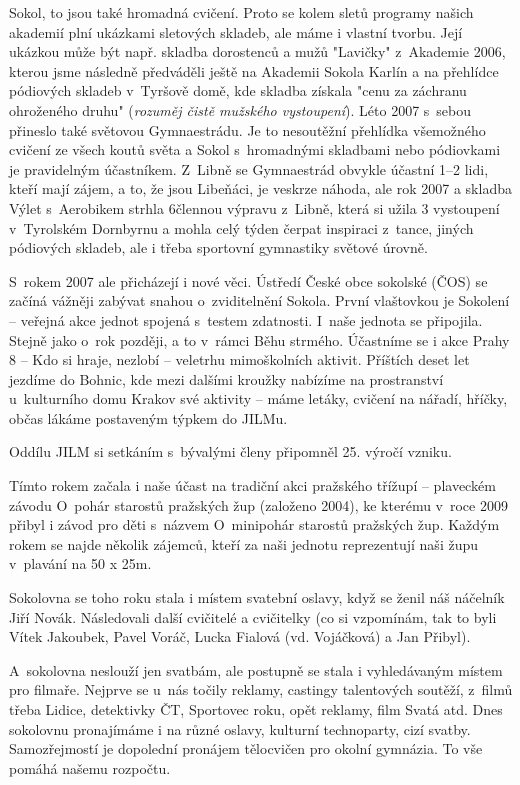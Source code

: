 \documentclass[a5paper, 11pt, twoside]{article}
\begin{document}
Sokol, to jsou také hromadná cvičení. Proto se kolem sletů programy
našich akademií plní ukázkami sletových skladeb, ale máme i vlastní
tvorbu. Její ukázkou může být např. skladba dorostenců a mužů "Lavičky"
z~Akademie 2006, kterou jsme následně předváděli ještě na Akademii
Sokola Karlín a na přehlídce pódiových skladeb v~Tyršově domě, kde
skladba získala "cenu za záchranu ohroženého druhu" (\textit{rozuměj
čistě mužského vystoupení}). Léto 2007 s~sebou přineslo také světovou
Gymnaestrádu. Je to nesoutěžní přehlídka všemožného cvičení ze všech
koutů světa a Sokol s~hromadnými skladbami nebo pódiovkami je
pravidelným účastníkem. Z~Libně se Gymnaestrád obvykle účastní 1--2
lidi, kteří mají zájem, a to, že jsou Libeňáci, je veskrze náhoda, ale
rok 2007 a skladba Výlet s~Aerobikem strhla 6člennou výpravu z~Libně,
která si užila 3 vystoupení v~Tyrolském Dornbyrnu a mohla celý týden
čerpat inspiraci z~tance, jiných pódiových skladeb, ale i třeba
sportovní gymnastiky světové úrovně.

S~rokem 2007 ale přicházejí i nové věci. Ústředí České obce sokolské
(ČOS) se začíná vážněji zabývat snahou o~zviditelnění Sokola. První
vlaštovkou je Sokolení -- veřejná akce jednot spojená s~testem
zdatnosti. I~naše jednota se připojila. Stejně jako o~rok později, a to
v~rámci Běhu strmého. Účastníme se i akce Prahy 8 -- Kdo si hraje,
nezlobí -- veletrhu mimoškolních aktivit. Příštích deset let jezdíme do
Bohnic, kde mezi dalšími kroužky nabízíme na prostranství u~kulturního
domu Krakov své aktivity -- máme letáky, cvičení na nářadí, hříčky,
občas lákáme postaveným týpkem do JILMu.

Oddílu JILM si setkáním s~bývalými členy připomněl 25. výročí vzniku.

Tímto rokem začala i naše účast na tradiční akci pražského třížupí --
plaveckém závodu O~pohár starostů pražských žup (založeno 2004), ke
kterému v~roce 2009 přibyl i závod pro děti s~názvem O~minipohár
starostů pražských žup. Každým rokem se najde několik zájemců, kteří za
naši jednotu reprezentují naši župu v~plavání na 50 x 25m.

Sokolovna se toho roku stala i místem svatební oslavy, když se ženil náš
náčelník Jiří Novák. Následovali další cvičitelé a cvičitelky (co si
vzpomínám, tak to byli Vítek Jakoubek, Pavel Voráč, Lucka Fialová (vd.
Vojáčková) a Jan Přibyl).

A~sokolovna neslouží jen svatbám, ale postupně se stala i vyhledávaným
místem pro filmaře. Nejprve se u~nás točily reklamy, castingy
talentových soutěží, z~filmů třeba Lidice, detektivky ČT, Sportovec
roku, opět reklamy, film Svatá atd. Dnes sokolovnu pronajímáme i na
různé oslavy, kulturní technoparty, cizí svatby. Samozřejmostí je
dopolední pronájem tělocvičen pro okolní gymnázia. To vše pomáhá našemu
rozpočtu.
\end{document}

